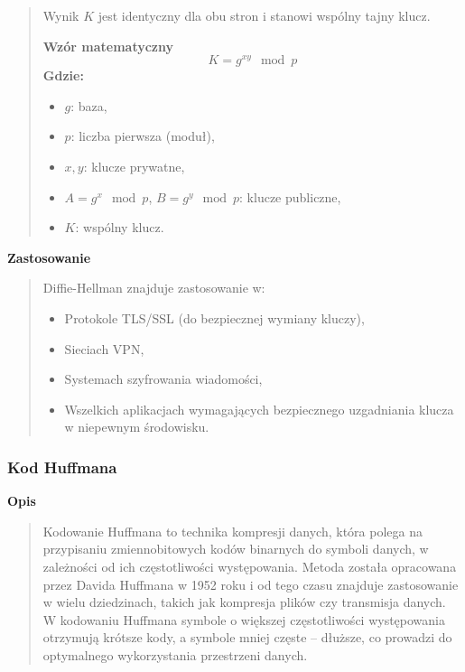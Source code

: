 \documentclass[12pt,a4paper]{article}
\begin{document}
\begin{quotation}
Wynik \( K \) jest identyczny dla obu stron i stanowi wspólny tajny klucz. \newline

\noindent\textbf{Wzór matematyczny}
\[
K = g^{xy} \mod p
\]
\newpage
\textbf{Gdzie:}
\begin{itemize}
    \item \( g \): baza,
    \item \( p \): liczba pierwsza (moduł),
    \item \( x, y \): klucze prywatne,
    \item \( A = g^x \mod p \), \( B = g^y \mod p \): klucze publiczne,
    \item \( K \): wspólny klucz.
\end{itemize}
\end{quotation}

\noindent\textbf{Zastosowanie}
\begin{quotation}\noindent  Diffie-Hellman znajduje zastosowanie w:
\begin{itemize}
\item Protokole TLS/SSL (do bezpiecznej wymiany kluczy),
\item Sieciach VPN,
\item Systemach szyfrowania wiadomości,
\item Wszelkich aplikacjach wymagających bezpiecznego uzgadniania klucza w niepewnym środowisku.
\end{itemize}
\end{quotation}

\subsubsection{Kod Huffmana}
\noindent\textbf{Opis}
\begin{quotation}\noindent Kodowanie Huffmana to technika kompresji danych, która polega na przypisaniu zmiennobitowych kodów binarnych do symboli danych, w zależności od ich częstotliwości występowania. Metoda została opracowana przez Davida Huffmana w 1952 roku i od tego czasu znajduje zastosowanie w wielu dziedzinach, takich jak kompresja plików czy transmisja danych. W kodowaniu Huffmana symbole o większej częstotliwości występowania otrzymują krótsze kody, a symbole mniej częste – dłuższe, co prowadzi do optymalnego wykorzystania przestrzeni danych.
\end{quotation}
\end{document}

